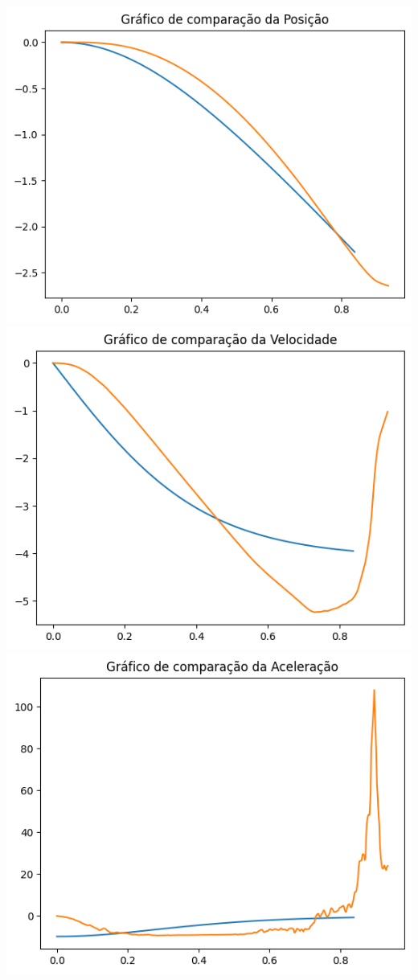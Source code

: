\documentclass{article}
\begin{document}
\includegraphics{Q-comparacao-tempo-altura.png}\\
\includegraphics{Q-comparacao-tempo-velocidade.png}\\
\includegraphics{Q-comparacao-tempo-aceleracao.png}\\
\end{document}
